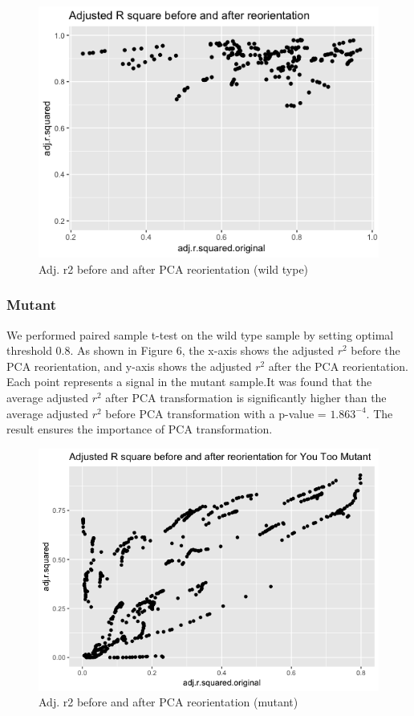 \documentclass[10pt,letterpaper]{article}
\begin{document}
\begin{figure}[H]
\includegraphics[width=0.9\linewidth]{visualization_paper/r2_ro_comparison_wt} \caption{Adj. r2 before and after PCA reorientation (wild type)}\label{fig:Figure5}
\end{figure}

\hypertarget{mutant-1}{%
\subsubsection{Mutant}\label{mutant-1}}

We performed paired sample t-test on the wild type sample by setting
optimal threshold 0.8. As shown in Figure 6, the x-axis shows the
adjusted \(r^2\) before the PCA reorientation, and y-axis shows the
adjusted \(r^2\) after the PCA reorientation. Each point represents a
signal in the mutant sample.It was found that the average adjusted
\(r^2\) after PCA transformation is significantly higher than the
average adjusted \(r^2\) before PCA transformation with a p-value =
\(1.863^{-4}\). The result ensures the importance of PCA transformation.

\begin{figure}[H]
\includegraphics[width=0.9\linewidth]{visualization_paper/r2_ro_comparison_yt} \caption{Adj. r2 before and after PCA reorientation (mutant)}\label{fig:Figure6}
\end{figure}
\end{document}
